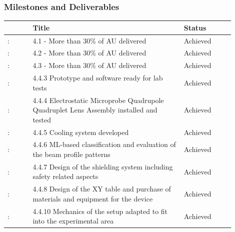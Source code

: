 \subsubsection*{Milestones and Deliverables}

{\fontsize{9}{11}\selectfont
\begin{center}
  \begin{tabular}[t]{!{\color{mygray}\vrule}p{0.10\linewidth}!
  {\color{mygray}\vrule}p{0.60\linewidth}!
  {\color{mygray}\vrule}p{0.20\linewidth}!{\color{mygray}\vrule} } \hline
     & {\bf Title} & {\bf Status} \\ \hline
    : & 4.1 - More than 30\% of AU delivered &  Achieved \\ \hline
    : & 4.2 - More than 30\% of AU delivered &  Achieved \\ \hline
    : & 4.3 - More than 30\% of AU delivered &  Achieved \\ \hline
    : & 4.4.3 	Prototype and software ready for lab tests &  Achieved \\ \hline
    : & 4.4.4 	Electrostatic Microprobe Quadrupole Quadruplet Lens Assembly installed and tested &  Achieved \\ \hline
    : & 4.4.5 	Cooling system developed &  Achieved \\ \hline
    : & 4.4.6 ML-based classification and evaluation of the beam profile patterns &  Achieved \\ \hline
    : & 4.4.7 	Design of the shielding system including safety related aspects &  Achieved \\ \hline
    : & 4.4.8 	Design of the XY table and purchase of materials and equipment for the device &  Achieved \\ \hline
    : & 4.4.10 Mechanics of the setup adapted to fit into the experimental area &  Achieved \\ \hline

  \end{tabular}
\end{center}
}


